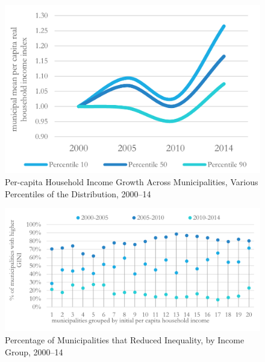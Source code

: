 \documentclass[dv_diss_main.tex]{subfiles}
\begin{document}
\begin{figure}[H] 
	\centering 
	
	\includegraphics[width=0.8\linewidth]{figures/FAIS_des_income.png}
	\caption{Per-capita Household Income Growth Across Municipalities, Various Percentiles of the Distribution, 2000–14}\label{fig:des2}
	
	\parbox{\textwidth}{\small 
	\vspace{2eX}
	\footnotesize
	\pcincomegrowth
	}
\end{figure}
	
\begin{figure}[H] 
	\centering 
	
	\includegraphics[width=\linewidth]{figures/descriptives_1.png}
	\caption{Percentage of Municipalities that Reduced Inequality, by Income Group, 2000–14}\label{fig:des3}
	
	\parbox{\textwidth}{\small 
	\vspace{2eX}
	\footnotesize
	\pcinequality
	}
\end{figure}

\newpage


\end{document}
